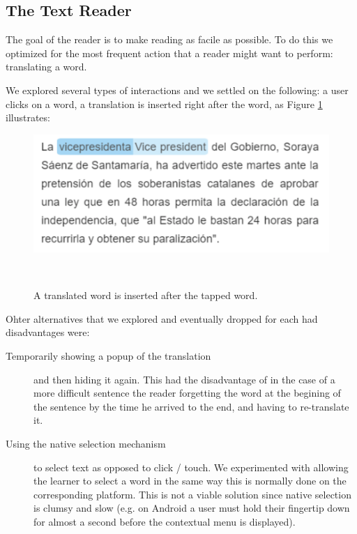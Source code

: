 


\subsection{The Text Reader}

The goal of the reader is to make reading as facile as possible. To do this we optimized for the most frequent action that a reader might want to perform: translating a word. 

We explored several types of interactions and we settled on the following: a user clicks on a word, a translation is inserted right after the word, as Figure \ref{fig:translated_word} illustrates: 

\begin{figure}[h!]
\centering
  \includegraphics[width=0.8\columnwidth]{figures/translated_word}
  \caption{A translated word is inserted after the tapped word.}~\label{fig:translated_word}
\end{figure}

Ohter alternatives that we explored and eventually dropped for each had disadvantages were: 
\begin{description}

  \item [Temporarily showing a popup of the translation] and then hiding it again. This had the disadvantage of in the case of a more difficult sentence the reader forgetting the word at the begining of the sentence by the time he arrived to the end, and having to re-translate it. 

  \item [Using the native selection mechanism] to select text as opposed to click / touch. We experimented with allowing the learner to select a word in the same way this is normally done on the corresponding platform. This is not a viable solution since native selection is clumsy and slow (e.g. on Android a user must hold their fingertip down for almost a second before the contextual menu is displayed). 
\end{description}


